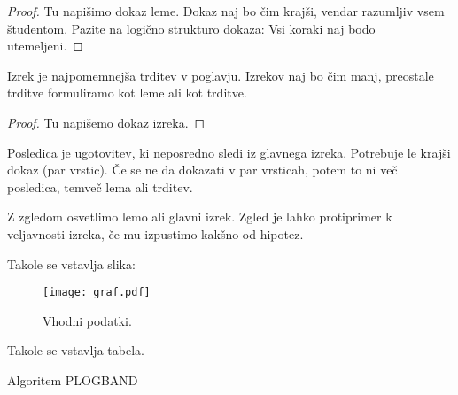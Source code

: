 \documentclass[12pt,a4paper,titlepage,openany]{report}
\begin{document}
\begin{proof}
Tu napišimo dokaz leme. Dokaz naj bo čim krajši, vendar razumljiv vsem študentom. Pazite na logično strukturo dokaza: Vsi koraki naj bodo utemeljeni.
\end{proof}

\begin{izr}
Izrek je najpomemnejša trditev v poglavju. Izrekov naj bo čim manj, preostale trditve formuliramo kot leme ali kot trditve.
\end{izr}

\begin{proof}
Tu napišemo dokaz izreka.
\end{proof}

\begin{posl}
Posledica je ugotovitev, ki neposredno sledi iz glavnega izreka. Potrebuje le krajši dokaz (par vrstic). Če se ne da dokazati v par vrsticah, potem to ni več posledica, temveč lema ali trditev.
\end{posl}

\begin{prim}
Z zgledom osvetlimo lemo ali glavni izrek. Zgled je lahko protiprimer k veljavnosti izreka, če mu izpustimo kakšno od hipotez.
\end{prim}

\newpage
Takole se vstavlja slika:

\bigskip
\bigskip
\begin{figure}[h!]
\begin{center}
\texttt{[image: graf.pdf]}
\end{center}
\caption{Vhodni podatki.}\label{slika:podatki}
\end{figure}

\newpage
 Takole se vstavlja tabela.

\begin{table}[h!]
\caption{Algoritem PLOGBAND}
\label{tabela:algoritem}
\fbox{%
      \parbox{\linewidth}{%
{\noindent \bf Algoritem PLOGBAND:}
\vskip 5pt
\indent Podatka: {\obeylines \indent \indent graf $G = G(V,E)$ na $n$ vozliščih in z $m$ povezavami,
\indent \indent $L \in \N$.}
\begin{enumerate}

\item Za $1 \le j \le L$ naj bodo $p_j$ približno enakomerno
(geometrijsko) razporejena števila med $1 - 1/\log\log n$ in $1/\log n$.
Tj., vsa razmerja $p_j/p_{j+1}$ naj bodo približno enaka. (Natančne
formule so v~razdelku \ref{siroke}, kjer je opisana vložitev naključnih podmnožic.)

\item Uredi vozlišča glede na naraščajoče vrednosti $h(v)$. Vozlišča z enakimi
vrednostmi $h$ uredi poljubno.

\item Vrni urejeni seznam vozlišč kot linearno ureditev.
\end{enumerate}
}}
\end{table}
\end{document}
